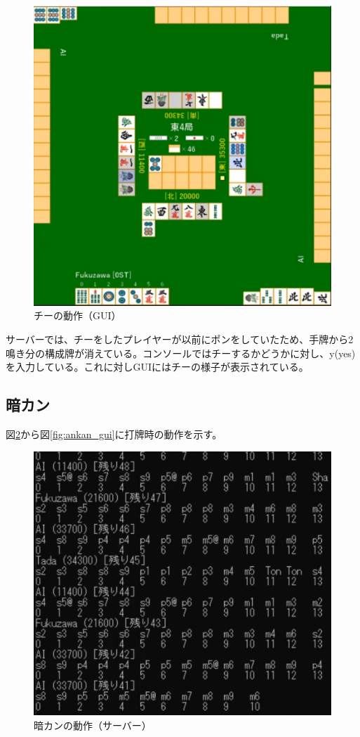 \documentclass[a4j,titlepage]{jsarticle}
\begin{document}
\begin{figure}[htbp]
  \centering
  \includegraphics[width = 0.8\linewidth]{images/chi_gui.png}
  \caption{チーの動作（GUI）}
  \label{fig:chi_gui}
\end{figure}

サーバーでは、チーをしたプレイヤーが以前にポンをしていたため、手牌から2鳴き分の構成牌が消えている。コンソールではチーするかどうかに対し、y(yes)を入力している。これに対しGUIにはチーの様子が表示されている。

\subsection{暗カン}
図\ref{fig:ankan_server}から図\ref{fig:ankan_gui}に打牌時の動作を示す。

\begin{figure}[htbp]
  \centering
  \includegraphics[width = 0.8\linewidth]{images/ankan_server.png}
  \caption{暗カンの動作（サーバー）}
  \label{fig:ankan_server}
\end{figure}
\end{document}
